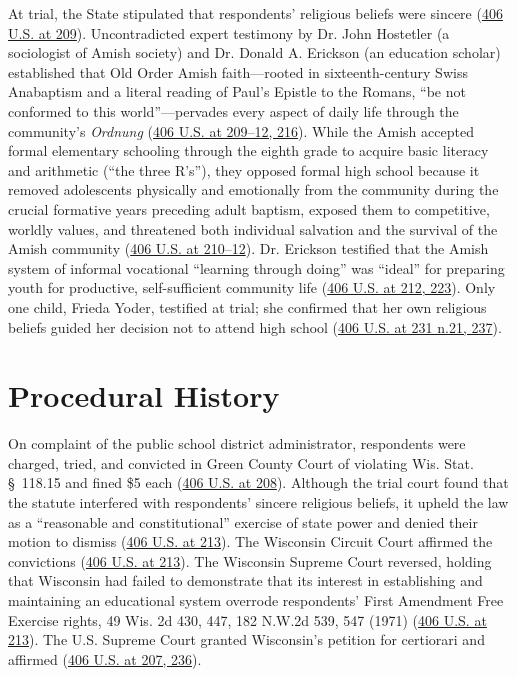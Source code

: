 \documentclass[12pt]{article}
\begin{document}
At trial, the State stipulated that respondents' religious beliefs were sincere (\href{https://supreme.justia.com/cases/federal/us/406/205/}{406 U.S. at 209}). Uncontradicted expert testimony by Dr. John Hostetler (a sociologist of Amish society) and Dr. Donald A. Erickson (an education scholar) established that Old Order Amish faith---rooted in sixteenth-century Swiss Anabaptism and a literal reading of Paul's Epistle to the Romans, ``be not conformed to this world''---pervades every aspect of daily life through the community's \emph{Ordnung} (\href{https://supreme.justia.com/cases/federal/us/406/205/}{406 U.S. at 209--12, 216}). While the Amish accepted formal elementary schooling through the eighth grade to acquire basic literacy and arithmetic (``the three R's''), they opposed formal high school because it removed adolescents physically and emotionally from the community during the crucial formative years preceding adult baptism, exposed them to competitive, worldly values, and threatened both individual salvation and the survival of the Amish community (\href{https://supreme.justia.com/cases/federal/us/406/205/}{406 U.S. at 210--12}). Dr. Erickson testified that the Amish system of informal vocational ``learning through doing'' was ``ideal'' for preparing youth for productive, self-sufficient community life (\href{https://supreme.justia.com/cases/federal/us/406/205/}{406 U.S. at 212, 223}). Only one child, Frieda Yoder, testified at trial; she confirmed that her own religious beliefs guided her decision not to attend high school (\href{https://supreme.justia.com/cases/federal/us/406/205/}{406 U.S. at 231 n.21, 237}).

\section{Procedural History}
On complaint of the public school district administrator, respondents were charged, tried, and convicted in Green County Court of violating Wis. Stat. \S~118.15 and fined \$5 each (\href{https://supreme.justia.com/cases/federal/us/406/205/}{406 U.S. at 208}). Although the trial court found that the statute interfered with respondents' sincere religious beliefs, it upheld the law as a ``reasonable and constitutional'' exercise of state power and denied their motion to dismiss (\href{https://supreme.justia.com/cases/federal/us/406/205/}{406 U.S. at 213}). The Wisconsin Circuit Court affirmed the convictions (\href{https://supreme.justia.com/cases/federal/us/406/205/}{406 U.S. at 213}). The Wisconsin Supreme Court reversed, holding that Wisconsin had failed to demonstrate that its interest in establishing and maintaining an educational system overrode respondents' First Amendment Free Exercise rights, 49 Wis. 2d 430, 447, 182 N.W.2d 539, 547 (1971) (\href{https://supreme.justia.com/cases/federal/us/406/205/}{406 U.S. at 213}). The U.S. Supreme Court granted Wisconsin's petition for certiorari and affirmed (\href{https://supreme.justia.com/cases/federal/us/406/205/}{406 U.S. at 207, 236}).
\end{document}
